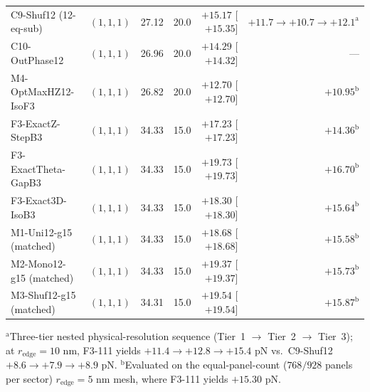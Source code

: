 \documentclass[11pt, a4paper]{article}
\begin{document}
\begin{table}[htbp]
\begin{tabular}{l c c c r r}
C9-Shuf12 (12-eq-sub) & $(1,1,1)$ & 27.12 & 20.0 & $+15.17$ [$+15.35$] & $+11.7 \to +10.7 \to +12.1^{\mathrm{a}}$ \\
C10-OutPhase12 & $(1,1,1)$ & 26.96 & 20.0 & $+14.29$ [$+14.32$] & --- \\
M4-OptMaxHZ12-IsoF3 & $(1,1,1)$ & 26.82 & 20.0 & $+12.70$ [$+12.70$] & $+10.95^{\mathrm{b}}$ \\
\midrule
F3-ExactZ-StepB3 & $(1,1,1)$ & 34.33 & 15.0 & $+17.23$ [$+17.23$] & $+14.36^{\mathrm{b}}$ \\
F3-ExactTheta-GapB3 & $(1,1,1)$ & 34.33 & 15.0 & $+19.73$ [$+19.73$] & $+16.70^{\mathrm{b}}$ \\
F3-Exact3D-IsoB3 & $(1,1,1)$ & 34.33 & 15.0 & $+18.30$ [$+18.30$] & $+15.64^{\mathrm{b}}$ \\
\midrule
M1-Uni12-g15 (matched) & $(1,1,1)$ & 34.33 & 15.0 & $+18.68$ [$+18.68$] & $+15.58^{\mathrm{b}}$ \\
M2-Mono12-g15 (matched) & $(1,1,1)$ & 34.33 & 15.0 & $+19.37$ [$+19.37$] & $+15.73^{\mathrm{b}}$ \\
M3-Shuf12-g15 (matched) & $(1,1,1)$ & 34.31 & 15.0 & $+19.54$ [$+19.54$] & $+15.87^{\mathrm{b}}$ \\
\bottomrule
\end{tabular}
\par\smallskip\footnotesize
$^{\mathrm{a}}$Three-tier nested physical-resolution sequence (Tier~1 $\to$ Tier~2 $\to$ Tier~3); at $r_{\mathrm{edge}}=10\text{ nm}$, F3-111 yields $+11.4 \to +12.8 \to +15.4\text{ pN}$ vs.\ C9-Shuf12 $+8.6 \to +7.9 \to +8.9\text{ pN}$. $^{\mathrm{b}}$Evaluated on the equal-panel-count ($768/928$ panels per sector) $r_{\mathrm{edge}}=5\text{ nm}$ mesh, where F3-111 yields $+15.30\text{ pN}$.
\end{table}
\end{document}
